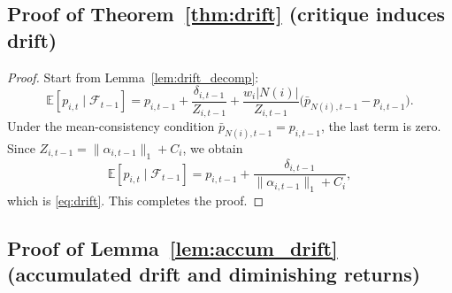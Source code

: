 \subsection{Proof of Theorem~\ref{thm:drift} (critique induces drift)}
\label{app:proof_drift}

\begin{proof}
Start from Lemma~\ref{lem:drift_decomp}:
\[
\mathbb{E}[p_{i,t}\mid \mathcal{F}_{t-1}]
= p_{i,t-1}
+ \frac{\delta_{i,t-1}}{Z_{i,t-1}}
+ \frac{w_i|N(i)|}{Z_{i,t-1}}\big(\bar p_{N(i),t-1}-p_{i,t-1}\big).
\]
Under the mean-consistency condition \(\bar p_{N(i),t-1}=p_{i,t-1}\), the last term is zero.
Since \(Z_{i,t-1}=\|\alpha_{i,t-1}\|_1+C_i\), we obtain
\[
\mathbb{E}[p_{i,t}\mid \mathcal{F}_{t-1}]
=
p_{i,t-1}
+\frac{\delta_{i,t-1}}{\|\alpha_{i,t-1}\|_1+C_i},
\]
which is \eqref{eq:drift}. This completes the proof.
\end{proof}

\subsection{Proof of Lemma~\ref{lem:accum_drift} (accumulated drift and diminishing returns)}
\label{app:proof_accum}

